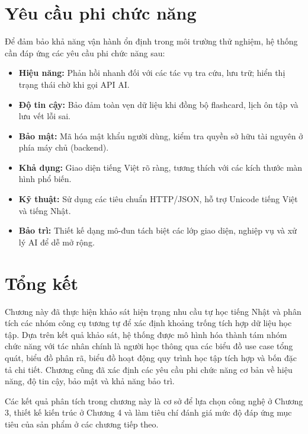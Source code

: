 \documentclass[../DoAn.tex]{subfiles}
\begin{document}
\section{Yêu cầu phi chức năng}
\label{section:2.4}

Để đảm bảo khả năng vận hành ổn định trong môi trường thử nghiệm, hệ thống cần đáp ứng các yêu cầu phi chức năng sau:
\begin{itemize}[itemsep=0pt,parsep=0pt,topsep=2pt,partopsep=0pt]
    \item \textbf{Hiệu năng:} Phản hồi nhanh đối với các tác vụ tra cứu, lưu trữ; hiển thị trạng thái chờ khi gọi API AI.
    \item \textbf{Độ tin cậy:} Bảo đảm toàn vẹn dữ liệu khi đồng bộ flashcard, lịch ôn tập và lưu vết lỗi sai.
    \item \textbf{Bảo mật:} Mã hóa mật khẩu người dùng, kiểm tra quyền sở hữu tài nguyên ở phía máy chủ (backend).
    \item \textbf{Khả dụng:} Giao diện tiếng Việt rõ ràng, tương thích với các kích thước màn hình phổ biến.
    \item \textbf{Kỹ thuật:} Sử dụng các tiêu chuẩn HTTP/JSON, hỗ trợ Unicode tiếng Việt và tiếng Nhật.
    \item \textbf{Bảo trì:} Thiết kế dạng mô-đun tách biệt các lớp giao diện, nghiệp vụ và xử lý AI để dễ mở rộng.
\end{itemize}

\section{Tổng kết}
\label{section:2.5}

Chương này đã thực hiện khảo sát hiện trạng nhu cầu tự học tiếng Nhật và phân tích các nhóm công cụ tương tự để xác định khoảng trống tích hợp dữ liệu học tập. Dựa trên kết quả khảo sát, hệ thống được mô hình hóa thành tám nhóm chức năng với tác nhân chính là người học thông qua các biểu đồ use case tổng quát, biểu đồ phân rã, biểu đồ hoạt động quy trình học tập tích hợp và bốn đặc tả chi tiết. Chương cũng đã xác định các yêu cầu phi chức năng cơ bản về hiệu năng, độ tin cậy, bảo mật và khả năng bảo trì.

Các kết quả phân tích trong chương này là cơ sở để lựa chọn công nghệ ở Chương 3, thiết kế kiến trúc ở Chương 4 và làm tiêu chí đánh giá mức độ đáp ứng mục tiêu của sản phẩm ở các chương tiếp theo.
\end{document}
